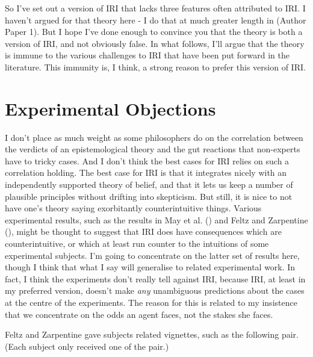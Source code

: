 \documentclass[
  11pt,
  letterpaper,
  DIV=11,
  numbers=noendperiod,
  oneside]{scrartcl}
\begin{document}
So I've set out a version of IRI that lacks three features often
attributed to IRI. I haven't argued for that theory here - I do that at
much greater length in (Author Paper 1). But I hope I've done enough to
convince you that the theory is both a version of IRI, and not obviously
false. In what follows, I'll argue that the theory is immune to the
various challenges to IRI that have been put forward in the literature.
This immunity is, I think, a strong reason to prefer this version of
IRI.

\section{Experimental Objections}\label{sect:xphi}

I don't place as much weight as some philosophers do on the correlation
between the verdicts of an epistemological theory and the gut reactions
that non-experts have to tricky cases. And I don't think the best cases
for IRI relies on such a correlation holding. The best case for IRI is
that it integrates nicely with an independently supported theory of
belief, and that it lets us keep a number of plausible principles
without drifting into skepticism. But
still, it is nice to not have one's theory saying exorbitantly
counterintuitive things. Various experimental results, such as the
results in May et al. () and Feltz and
Zarpentine (), might be thought
to suggest that IRI does have consequences which are counterintuitive,
or which at least run counter to the intuitions of some experimental
subjects. I'm going to concentrate on the latter set of results here,
though I think that what I say will generalise to related experimental
work. In fact, I think the experiments don't really tell against IRI,
because IRI, at least in my preferred version, doesn't make \emph{any}
unambiguous predictions about the cases at the centre of the
experiments. The reason for this is related to my insistence that we
concentrate on the odds an agent faces, not the stakes she faces.

Feltz and Zarpentine gave subjects related vignettes, such as the
following pair. (Each subject only received one of the pair.)
\end{document}
